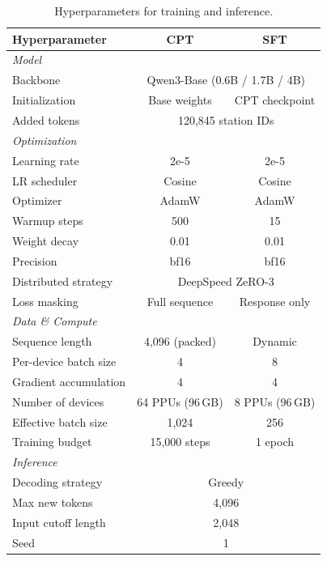 \documentclass{llmxive}
\begin{document}
\begin{table}[t]
\centering
\small
\setlength{\tabcolsep}{8pt}
\begin{tabular}{@{}lcc@{}}
\toprule
\textbf{Hyperparameter} & \textbf{CPT} & \textbf{SFT} \\
\midrule
\multicolumn{3}{l}{\textit{Model}} \\[2pt]
\quad Backbone & \multicolumn{2}{c}{Qwen3-Base (0.6B / 1.7B / 4B)} \\
\quad Initialization & Base weights & CPT checkpoint \\
\quad Added tokens & \multicolumn{2}{c}{120,845 station IDs} \\
\midrule
\multicolumn{3}{l}{\textit{Optimization}} \\[2pt]
\quad Learning rate & 2e-5 & 2e-5 \\
\quad LR scheduler & Cosine & Cosine \\
\quad Optimizer & AdamW & AdamW \\
\quad Warmup steps & 500 & 15 \\
\quad Weight decay & 0.01 & 0.01 \\
\quad Precision & bf16 & bf16 \\
\quad Distributed strategy & \multicolumn{2}{c}{DeepSpeed ZeRO-3} \\
\quad Loss masking & Full sequence & Response only \\
\midrule
\multicolumn{3}{l}{\textit{Data \& Compute}} \\[2pt]
\quad Sequence length & 4,096 (packed) & Dynamic \\
\quad Per-device batch size & 4 & 8 \\
\quad Gradient accumulation & 4 & 4 \\
\quad Number of devices & 64 PPUs (96\,GB) & 8 PPUs (96\,GB) \\
\quad Effective batch size & 1,024 & 256 \\
\quad Training budget & 15,000 steps & 1 epoch \\
\midrule
\multicolumn{3}{l}{\textit{Inference}} \\[2pt]
\quad Decoding strategy & \multicolumn{2}{c}{Greedy} \\
\quad Max new tokens & \multicolumn{2}{c}{4,096} \\
\quad Input cutoff length & \multicolumn{2}{c}{2,048} \\
\quad Seed & \multicolumn{2}{c}{1} \\
\bottomrule
\end{tabular}
\caption{Hyperparameters for training and inference.}
\label{tab:hyperparams}
\end{table}
\end{document}
